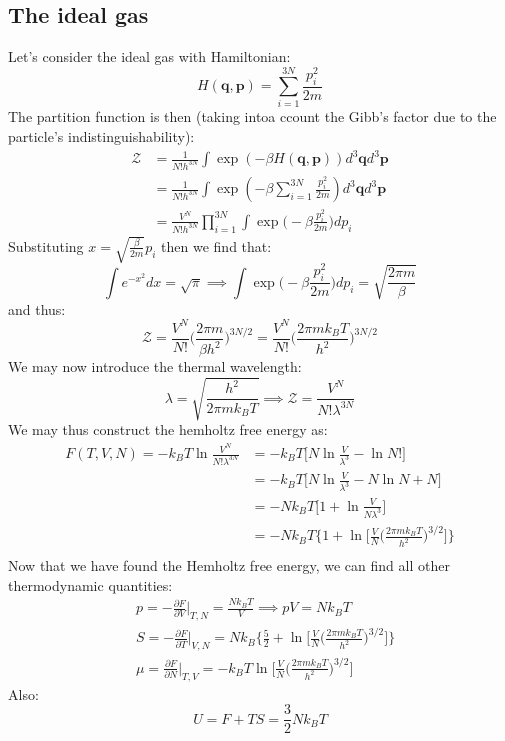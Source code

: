 \documentclass[a4paper,11pt,oneside]{book}
\begin{document}
\subsection{The ideal gas}
Let's consider the ideal gas with Hamiltonian:
\begin{equation}
    H(\textbf{q},\textbf{p}) = \sum_{i=1}^{3N} \frac{{p}_i^2}{2m}
\end{equation}
The partition function is then (taking intoa ccount the Gibb's factor due to the particle's indistinguishability):
\begin{align}
    \mathcal{Z} &= \frac{1}{N! h^{3N}} \int \exp (-\beta  H(\textbf{q},\textbf{p})) d^3\textbf{q} d^3\textbf{p} \\
    &=\frac{1}{N! h^{3N}} \int \exp (-\beta  \sum_{i=1}^{3N} \frac{{p}_i^2}{2m})d^3\textbf{q} d^3\textbf{p}\\
    &= \frac{V^N}{N! h^{3N}} \prod_{i=1}^{3N} \int \exp \bigg(-\beta \frac{{p}_i^2}{2m}\bigg) d{p}_i
\end{align}
Substituting $x=\sqrt{\frac{\beta}{2m}} p_i$ then we find that:
\begin{equation}
    \int e^{-x^2}dx = \sqrt{\pi} \implies \int \exp \bigg(-\beta \frac{{p}_i^2}{2m}\bigg) d{p}_i = \sqrt{\frac{2\pi m}{\beta}}
\end{equation}
and thus:
\begin{equation}
    \mathcal{Z} = \frac{V^N}{N!} \bigg(\frac{2\pi m}{\beta h^2}\bigg)^{3N/2} = \frac{V^N}{N!} \bigg(\frac{2\pi mk_B T}{ h^2}\bigg)^{3N/2}
\end{equation}
We may now introduce the thermal wavelength:
\begin{equation}
    \lambda = \sqrt{\frac{h^2}{2\pi m k_BT}} \implies \mathcal{Z} = \frac{V^N}{N! \lambda^{3N}}
\end{equation}
We may thus construct the hemholtz free energy as:
\begin{align}
    F(T,V,N) = -k_B T \ln \frac{V^N}{N! \lambda^{3N}} &= -k_B T \bigg[N \ln \frac{V}{\lambda^3} - \ln N!\bigg] \\
    &=-k_B T \bigg[N \ln \frac{V}{\lambda^3} - N\ln N+N\bigg]\\
    &= -Nk_B T \bigg[1+\ln \frac{V}{N \lambda^3}\bigg]\\
    &=  -Nk_B T \Bigg\{1+\ln\bigg[ \frac{V}{N}\bigg(\frac{2\pi mk_B T}{ h^2}\bigg)^{3/2}\bigg]\Bigg\}\\
\end{align}
Now that we have found the Hemholtz free energy, we can find all other thermodynamic quantities:
\begin{align}
    &p = -\frac{\partial F}{\partial V}\bigg|_{T,N} = \frac{Nk_B T}{V} \implies pV = Nk_B T\\
    &S = -\frac{\partial F}{\partial T}\bigg|_{V,N} = Nk_B \Bigg\{\frac{5}{2} + \ln \bigg[\frac{V}{N} \bigg(\frac{2\pi m k_B T}{h^2}\bigg)^{3/2}\bigg]\Bigg\}\\
    &\mu = \frac{\partial F}{\partial N}\bigg|_{T,V} = -k_B T \ln \bigg[\frac{V}{N} \bigg(\frac{2\pi m k_B T}{h^2}\bigg)^{3/2}\bigg]
\end{align}
Also:
\begin{equation}
    U=F+TS = \frac{3}{2}Nk_B T
\end{equation}
\end{document}
